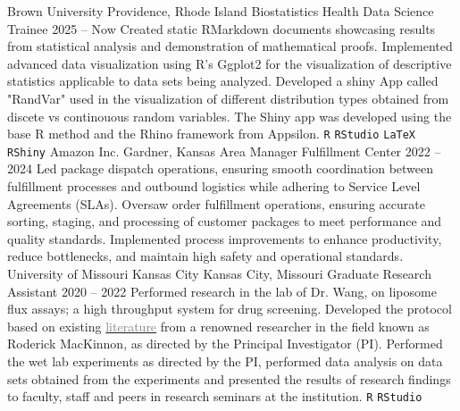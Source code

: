 \documentclass[9pt]{adeckcv} %
\begin{document}

\begin{entrylist}
    \entry
        {\large{Brown University}} 
        {Providence, Rhode Island}
        {\large{Biostatistics Health Data Science Trainee}}
        {2025 -- Now}
        {\itemizeexperience
        {Created static RMarkdown documents showcasing results from statistical analysis and demonstration of mathematical proofs.}
        {Implemented advanced data visualization using R's Ggplot2 for the visualization of descriptive statistics applicable to data sets being analyzed.}
        {Developed a shiny App called "RandVar" used in the visualization of different distribution types obtained from discete vs continouous random variables. The Shiny app was developed using the base R method and the Rhino framework from Appsilon.}
        \texttt{R}\slashsep
        \texttt{RStudio}\slashsep
        \faMarkdown\slashsep
        \texttt{LaTeX}\slashsep
        \texttt{RShiny}\slashsep
        \faWindows\slashsep 
        \faLinux\slashsep
        }
    \entry
        {\large{Amazon Inc.}}
        {Gardner, Kansas}
        {\large{Area Manager Fulfillment Center}}
        {2022 -- 2024}
        {\itemizeexperience
        {Led package dispatch operations, ensuring smooth coordination between fulfillment processes and outbound logistics while adhering to Service Level Agreements (SLAs).}
        {Oversaw order fulfillment operations, ensuring accurate sorting, staging, and processing of customer packages to meet performance and quality standards.}
        {Implemented process improvements to enhance productivity, reduce bottlenecks, and maintain high safety and operational standards.}
        \faAmazon\slashsep
        \faWarehouse
        }
    \entry
        {\large{University of Missouri Kansas City}}
        {Kansas City, Missouri}
        {\large{Graduate Research Assistant}}
        {2020 -- 2022}
        {\itemizeexperience
        {Performed research in the lab of Dr. Wang, on liposome flux assays; a high throughput system for drug screening. }
        {Developed the protocol based on existing \href{https://www.pnas.org/doi/10.1073/pnas.1602815113}{\textcolor{gray}{literature}} from a renowned researcher in the field known as Roderick MacKinnon, as directed by the Principal Investigator (PI).}
        {Performed the wet lab experiments as directed by the PI, performed data analysis on data sets obtained from the experiments and presented the results of research findings to faculty, staff and peers in research seminars at the institution.}
        \texttt{R}\slashsep
        \texttt{RStudio}\slashsep
        \faDna\slashsep
        \faSlideshare
        }
\end{entrylist}
\end{document}
